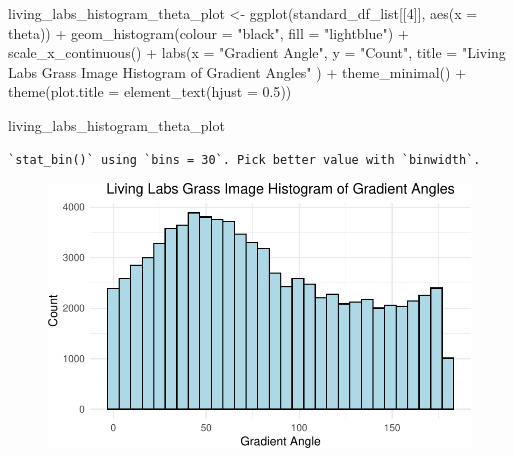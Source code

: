 \documentclass[
  letterpaper,
]{report}
\newenvironment{Shaded}{\begin{snugshade}}{\end{snugshade}}
\newcommand{\AttributeTok}[1]{\textcolor[rgb]{0.40,0.45,0.13}{#1}}
\newcommand{\DecValTok}[1]{\textcolor[rgb]{0.68,0.00,0.00}{#1}}
\newcommand{\FloatTok}[1]{\textcolor[rgb]{0.68,0.00,0.00}{#1}}
\newcommand{\FunctionTok}[1]{\textcolor[rgb]{0.28,0.35,0.67}{#1}}
\newcommand{\NormalTok}[1]{\textcolor[rgb]{0.00,0.23,0.31}{#1}}
\newcommand{\OtherTok}[1]{\textcolor[rgb]{0.00,0.23,0.31}{#1}}
\newcommand{\SpecialCharTok}[1]{\textcolor[rgb]{0.37,0.37,0.37}{#1}}
\newcommand{\StringTok}[1]{\textcolor[rgb]{0.13,0.47,0.30}{#1}}
\begin{document}
\begin{Shaded}
\begin{Highlighting}[]
\NormalTok{living\_labs\_histogram\_theta\_plot }\OtherTok{\textless{}{-}}
  \FunctionTok{ggplot}\NormalTok{(standard\_df\_list[[}\DecValTok{4}\NormalTok{]], }
         \FunctionTok{aes}\NormalTok{(}\AttributeTok{x =}\NormalTok{ theta)) }\SpecialCharTok{+}
  \FunctionTok{geom\_histogram}\NormalTok{(}\AttributeTok{colour =} \StringTok{"black"}\NormalTok{, }\AttributeTok{fill =} \StringTok{"lightblue"}\NormalTok{) }\SpecialCharTok{+}
  \FunctionTok{scale\_x\_continuous}\NormalTok{() }\SpecialCharTok{+} 
  \FunctionTok{labs}\NormalTok{(}\AttributeTok{x =} \StringTok{"Gradient Angle"}\NormalTok{, }
       \AttributeTok{y =} \StringTok{"Count"}\NormalTok{, }
       \AttributeTok{title =} \StringTok{"Living Labs Grass Image Histogram of Gradient Angles"}
\NormalTok{       ) }\SpecialCharTok{+}
  \FunctionTok{theme\_minimal}\NormalTok{() }\SpecialCharTok{+}
  \FunctionTok{theme}\NormalTok{(}\AttributeTok{plot.title =} \FunctionTok{element\_text}\NormalTok{(}\AttributeTok{hjust =} \FloatTok{0.5}\NormalTok{))}

\NormalTok{living\_labs\_histogram\_theta\_plot}
\end{Highlighting}
\end{Shaded}

\begin{verbatim}
`stat_bin()` using `bins = 30`. Pick better value with `binwidth`.
\end{verbatim}

\begin{figure}[H]

{\centering \includegraphics{results_files/figure-pdf/unnamed-chunk-12-2.pdf}

}

\end{figure}
\end{document}
